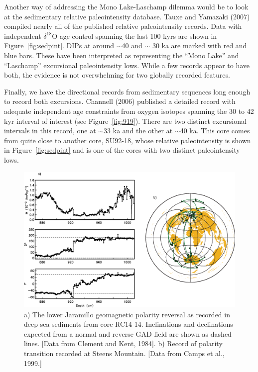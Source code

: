 Another way of addressing the Mono Lake-Laschamp dilemma would be to look at the sedimentary relative paleointensity database.  
Tauxe and Yamazaki (2007) compiled nearly all  of the published relative paleointensity records.  \nocite{tauxe07}  Data  with independent $\delta^{18}$O age control spanning the last 100 kyrs are shown in Figure~\ref{fig:sedpint}.  DIPs at around $\sim$40 and $\sim$ 30 ka are marked with red and blue bars.  These have been interpreted as representing  the ``Mono Lake'' and ``Laschamp'' excursional paleointensity lows.  While a few records appear to have both, the evidence is not overwhelming for two globally recorded features.      


Finally, we have the directional records from  sedimentary sequences long enough to record both excursions.    
Channell (2006) \nocite{channell06} published a detailed record with  adequate independent age constraints from oxygen isotopes spanning the 30 to 42 kyr interval of interest (see Figure~\ref{fig:919}).   There are two distinct excursional intervals in this record, one at $\sim$33 ka and the other at $\sim$40 ka.  This core comes from quite close to another core,  SU92-18,  whose relative paleointensity is shown in Figure~\ref{fig:sedpint} and is one of the cores with two distinct paleointensity lows.  

\begin{figure}[htb]
\centering  \includegraphics[width=14 cm]{EPSfiles/reversals.eps}
\caption{ a) The lower Jaramillo geomagnetic polarity reversal as recorded in deep sea
sediments from core RC14-14. 
Inclinations and declinations expected from a
normal and reverse GAD field are shown as dashed lines. 
[Data from Clement and Kent, 1984]. b) Record of polarity transition recorded at Steens Mountain. [Data from Camps et al., 1999.]  }
\label{fig:reversals}
\end{figure}


